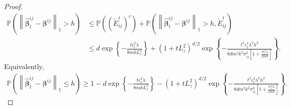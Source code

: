 \documentclass[12pt]{article}
\begin{document}
\begin{proof}
\begin{align*}
\mathbb P\left(
\left\|
\widehat{\bm\beta}_t^{ij}
-
\bm\beta^{ij}
\right\|_1
>
h
\right)
&\le 
\mathbb P\left(
(\widetilde E_{ij}^t)^c
\right)
+
\mathbb P\left(
\left\|
\widehat{\bm\beta}_t^{ij}
-
\bm\beta^{ij}
\right\|_1
>h,
\widetilde E_{ij}^t
\right)
\\
&\le
d\exp\left\{-\frac{t\epsilon_t^2\lambda}{8mkL_z^2}\right\}
+
\left(1+tL_z^2\right)^{d/2}
\exp\left\{
-
\frac{
t^2\epsilon_t^4\lambda^2h^2
}{
8dm^2k^2\sigma_{ij}^2
\left[
1+\frac{t\epsilon_t^2\lambda}{2mk}
\right]
}
\right\}.
\end{align*}
Equivalently,
\begin{align*}
\mathbb P\left(
\left\|
\widehat{\bm\beta}_t^{ij}
-
\bm\beta^{ij}
\right\|_1
\le
h\right) \ge
1-d\exp\left\{
-
\frac{
t\epsilon_t^2\lambda}{
8mkL_z^2}
\right\}
-
\left(
1+tL_z^2
\right)^{d/2}
\exp\left\{
-
\frac{
t^2\epsilon_t^4\lambda^2h^2}{8dm^2k^2\sigma_{ij}^2
\left[
1+\frac{t\epsilon_t^2\lambda}{2mk}
\right]
}
\right\}.
\end{align*}
\end{proof}
\end{document}
